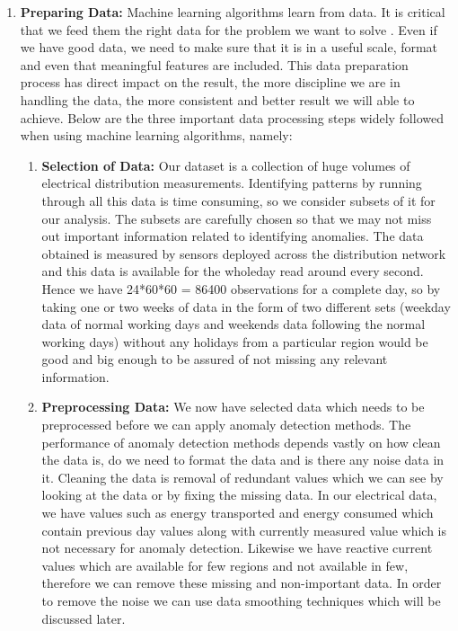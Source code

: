 \begin{enumerate}
\item\textbf{Preparing Data:} Machine learning algorithms learn from data. It is critical that we feed them the right data for the problem we want to solve \cite{brownlee2013prepare}. Even if we have good data, we need to make sure that it is in a useful scale, format and even that meaningful features are included. This data preparation process has direct impact on the result, the more discipline we are in handling the data, the more consistent and better result we will able to achieve. Below are the three important data processing steps widely followed when using machine learning algorithms, namely:
	\begin{enumerate}
		\item\textbf{Selection of Data:} Our dataset is a collection of huge volumes of electrical distribution measurements. Identifying patterns by running through all this data is time consuming, so we consider subsets of it for our analysis. The subsets are carefully chosen so that we may not miss out important information related to identifying anomalies. The data obtained is measured by sensors deployed across the distribution network and this data is available for the wholeday read around every second. Hence we have 24*60*60 = 86400 observations for a complete day, so by taking one or two weeks of data in the form of two different sets (weekday data of normal working days and weekends data following the normal working days) without any holidays from a particular region would be good and big enough to be assured of not missing any relevant information. 
		\item\textbf{Preprocessing Data:} We now have selected data which needs to be preprocessed before we can apply anomaly detection methods. The performance of anomaly detection methods depends vastly on how clean the data is, do we need to format the data and is there any noise data in it. Cleaning the data is removal of redundant values which we can see by looking at the data or by fixing the missing data. In our electrical data, we have values such as energy transported and energy consumed which contain previous day values along with currently measured value which is not necessary for anomaly detection. Likewise we have reactive current values which are available for few regions and not available in few, therefore we can remove these missing and non-important data. In order to remove the noise we can use data smoothing techniques which will be discussed later.

\end{enumerate}
\end{enumerate}
